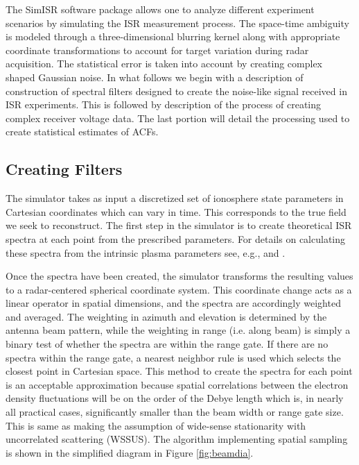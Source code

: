 \documentclass[draft,ras]{agutex}
\begin{document}
\begin{article}
The SimISR software package allows one to analyze different  experiment scenarios by simulating the ISR measurement process. %
The space-time ambiguity is modeled through a three-dimensional blurring kernel along with appropriate coordinate transformations to account for target variation during radar acquisition.   The statistical error is taken into account by creating complex shaped Gaussian noise.    
In what follows we begin with a description of construction of spectral filters designed to create the noise-like signal received in ISR experiments. This is followed by description of the process of creating complex receiver voltage data. The last portion will detail the processing used to create statistical estimates of ACFs.

\subsection{Creating Filters}

The simulator takes as input a discretized set of ionosphere state parameters in Cartesian coordinates which can vary in time.  This corresponds to the true field we seek to reconstruct. The first step in the simulator is to create theoretical ISR spectra at each point from the prescribed parameters. For details on calculating these spectra from the intrinsic plasma parameters see, e.g., \citet{kudeki:milla:1} and \citet{kudeki:milla:2}. 

Once the spectra have been created, the simulator transforms the resulting values to a radar-centered spherical coordinate system. This coordinate change acts as a linear operator in spatial dimensions, and the spectra are accordingly weighted and averaged. The weighting in azimuth and elevation is determined by the antenna beam pattern, while the weighting in range (i.e. along beam) is simply a binary test of whether the spectra are within the range gate. If there are no spectra within the range gate, a nearest neighbor rule is used which selects the closest point in Cartesian space. This method to create the spectra for each point is an acceptable approximation because spatial correlations between the electron density fluctuations will be on the order of the Debye length \citep{farley1969} which is, in nearly all practical cases, significantly smaller than the beam width or range gate size. This is same as making the assumption of wide-sense stationarity with uncorrelated scattering (WSSUS)\citep{Kailath:1962jx}. The algorithm implementing spatial sampling is shown in the simplified diagram in Figure \ref{fig:beamdia}.


\end{article}
\end{document}
